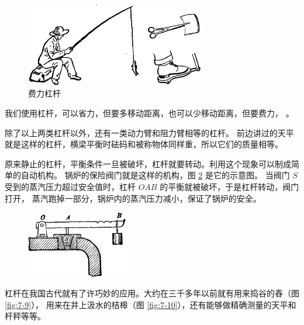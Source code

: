 \begin{figure}[htbp]
    \centering
    \includegraphics[width=0.7\textwidth]{../pic/czwl1-ch7-7}
    \caption{费力杠杆}\label{fig:7-7}
\end{figure}

我们使用杠杆，可以省力，但要多移动距离，也可以少移动距离，但要费力，
。

除了以上两类杠杆以外，还有一类动力臂和阻力臂相等的杠杆。
前边讲过的天平就是这样的杠杆，横梁平衡时砝码和被称物体同样重，所以它们的质量相等。

原来静止的杠杆，平衡条件一旦被破坏，杠杆就要转动。利用这个现象可以制成简单的自动机构。
锅炉的保险阀门就是这样的机构，图 \ref{fig:7-8} 是它的示意图。
当阀门 $S$ 受到的蒸汽压力超过安全值时，杠杆 $OAB$ 的平衡就被破坏，于是杠杆转动，阀门打开，
蒸汽跑掉一部分，锅炉内的蒸汽压力减小，保证了锅炉的安全。

\begin{figure}[htbp]
    \centering
    \includegraphics[width=0.4\textwidth]{../pic/czwl1-ch7-8}
    \caption{}\label{fig:7-8}
\end{figure}



杠杆在我国古代就有了许巧妙的应用。大约在三千多年以前就有用来捣谷的舂（图 \ref{fig:7-9}），
用来在井上汲水的桔槔（图 \ref{fig:7-10}），还有能够做精确测量的天平和杆秤等等。

